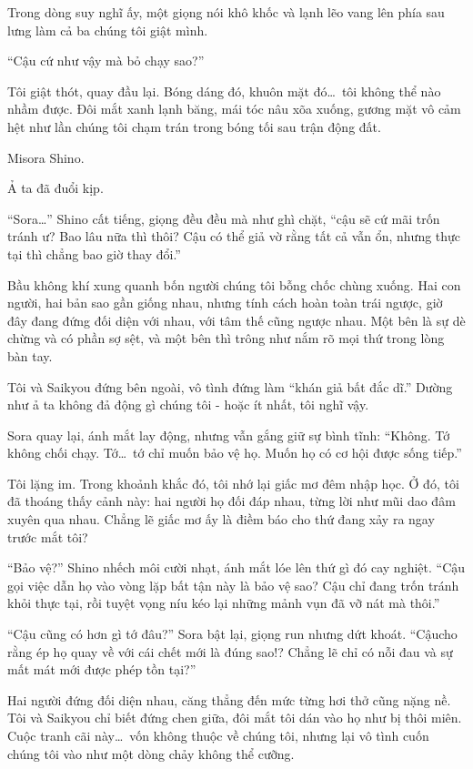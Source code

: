 \documentclass[../main.tex]{subfiles}
\begin{document}
Trong dòng suy nghĩ ấy, một giọng nói khô khốc và lạnh lẽo vang lên phía sau lưng làm cả ba chúng tôi giật mình.

``Cậu cứ như vậy mà bỏ chạy sao?''


Tôi giật thót, quay đầu lại. Bóng dáng đó, khuôn mặt đó\dots\ tôi không thể nào nhầm được. Đôi mắt xanh lạnh băng, mái tóc nâu xõa xuống, gương mặt vô cảm hệt như lần chúng tôi chạm trán trong bóng tối sau trận động đất.

Misora Shino.

Ả ta đã đuổi kịp.

``Sora\dots'' Shino cất tiếng, giọng đều đều mà như ghì chặt, ``cậu sẽ cứ mãi trốn tránh ư? Bao lâu nữa thì thôi? Cậu có thể giả vờ rằng tất cả vẫn ổn, nhưng thực tại thì chẳng bao giờ thay đổi.''

Bầu không khí xung quanh bốn người chúng tôi bỗng chốc chùng xuống. Hai con người, hai bản sao gần giống nhau, nhưng tính cách hoàn toàn trái ngược, giờ đây đang đứng đối diện với nhau, với tâm thế cũng ngược nhau. Một bên là sự dè chừng và có phần sợ sệt, và một bên thì trông như nắm rõ mọi thứ trong lòng bàn tay.

Tôi và Saikyou đứng bên ngoài, vô tình đứng làm ``khán giả bất đắc dĩ.'' Dường như ả ta không đả động gì chúng tôi - hoặc ít nhất, tôi nghĩ vậy.

Sora quay lại, ánh mắt lay động, nhưng vẫn gắng giữ sự bình tĩnh: ``Không. Tớ không chối chạy. Tớ\dots\ tớ chỉ muốn bảo vệ họ. Muốn họ có cơ hội được sống tiếp.''

Tôi lặng im. Trong khoảnh khắc đó, tôi nhớ lại giấc mơ đêm nhập học. Ở đó, tôi đã thoáng thấy cảnh này: hai người họ đối đáp nhau, từng lời như mũi dao đâm xuyên qua nhau. Chẳng lẽ giấc mơ ấy là điềm báo cho thứ đang xảy ra ngay trước mắt tôi?

``Bảo vệ?'' Shino nhếch môi cười nhạt, ánh mắt lóe lên thứ gì đó cay nghiệt. ``Cậu gọi việc dẫn họ vào vòng lặp bất tận này là bảo vệ sao? Cậu chỉ đang trốn tránh khỏi thực tại, rồi tuyệt vọng níu kéo lại những mảnh vụn đã vỡ nát mà thôi.''

``Cậu cũng có hơn gì tớ đâu?'' Sora bật lại, giọng run nhưng dứt khoát. ``Cậucho rằng ép họ quay về với cái chết mới là đúng sao!? Chẳng lẽ chỉ có nỗi đau và sự mất mát mới được phép tồn tại?''

Hai người đứng đối diện nhau, căng thẳng đến mức từng hơi thở cũng nặng nề. Tôi và Saikyou chỉ biết đứng chen giữa, đôi mắt tôi dán vào họ như bị thôi miên. Cuộc tranh cãi này\dots\ vốn không thuộc về chúng tôi, nhưng lại vô tình cuốn chúng tôi vào như một dòng chảy không thể cưỡng.
\end{document}
